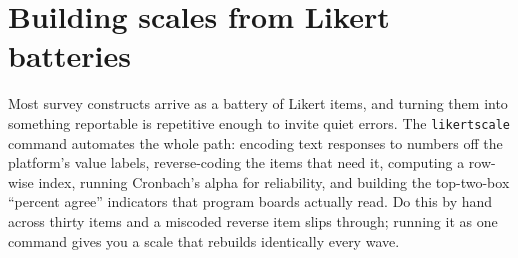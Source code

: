 \section{Building scales from Likert batteries}
Most survey constructs arrive as a battery of Likert items, and turning them into something reportable is repetitive enough to invite quiet errors. The \texttt{likertscale} command automates the whole path: encoding text responses to numbers off the platform's value labels, reverse-coding the items that need it, computing a row-wise index, running Cronbach's alpha \parencite{cronbach1951alpha} for reliability, and building the top-two-box \enquote{percent agree} indicators that program boards actually read. Do this by hand across thirty items and a miscoded reverse item slips through; running it as one command gives you a scale that rebuilds identically every wave.

